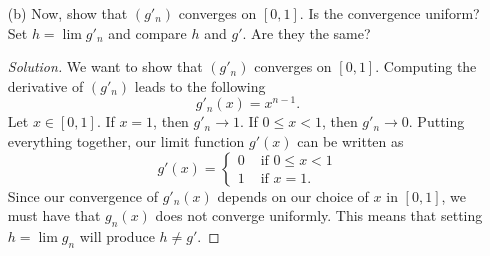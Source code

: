 \begin{enumerate}
\begin{proof}[Solution]
        Now we want to show that \( g  \) is a differentiable function. Let \( \epsilon > 0  \). Choose \( \delta > 0  \) such that whenever \( 0 < | x - c  | < \delta \), we have that 
        \begin{align*}
            \Big| \frac{ g(x) - g(c)  }{ x -c  } - 0  \Big| &= 0 < \epsilon. \\
        \end{align*}
        Hence, \( g  \) is differentiable and that \( g'(x) = 0  \) for all \( x \in [0,1] \).
        \end{proof}
    \item[(b)] Now, show that \( (g'_n) \) converges on \( [0,1]  \). Is the convergence uniform? Set \( h = \lim g'_n  \) and compare \( h  \) and \( g'  \). Are they the same?
        \begin{proof}[Solution]
            We want to show that \( (g'_n) \) converges on \( [0,1] \). Computing the derivative of \( (g'_n) \) leads to the following
            \[  g'_n(x) = x^{n-1}. \]
            Let \( x \in [0,1] \). If \( x = 1  \), then \( g'_n \to 1  \). If \( 0 \leq x < 1  \), then \( g'_n \to 0  \). Putting everything together, our limit function \( g'(x)  \) can be written as 
            \[ g'(x) = 
            \begin{cases}
                0 &\text{ if } 0 \leq x < 1 \\
                1 &\text{ if } x = 1.
            \end{cases}  \]
            Since our convergence of \( g'_n(x)  \) depends on our choice of \( x  \) in \( [0,1] \), we must have that \( g_n(x)  \) does not converge uniformly.
            This means that setting \( h = \lim g_n  \) will produce \( h \neq g' \).
        \end{proof}

\end{enumerate}

